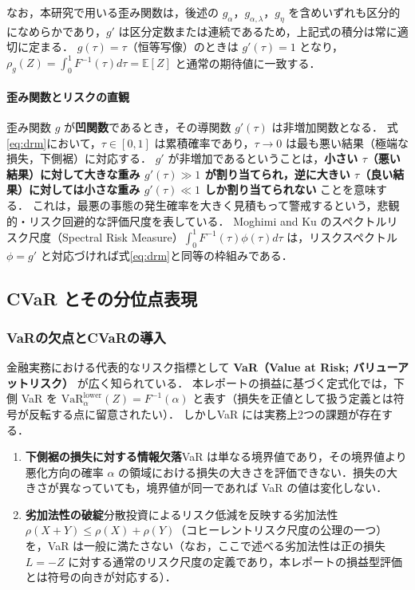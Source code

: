 \documentclass[a4paper,10pt]{jsarticle}
\theoremstyle{definition}
\renewcommand{\Finv}{F^{-1}}
\newcommand{\E}{\mathbb{E}}
\begin{document}
なお，本研究で用いる歪み関数は，後述の $g_\alpha$，$g_{\alpha,\lambda}$，$g_\eta$ を含めいずれも区分的になめらかであり，$g'$ は区分定数または連続であるため，上記式の積分は常に適切に定まる．
$g(\tau)=\tau$（恒等写像）のときは $g'(\tau)=1$ となり，$\rho_g(Z) = \int_0^1 \Finv(\tau)d\tau = \E[Z]$ と通常の期待値に一致する．

\paragraph{歪み関数とリスクの直観}
歪み関数 $g$ が\textbf{凹関数}であるとき，その導関数 $g'(\tau)$ は非増加関数となる．
式\eqref{eq:drm}において，$\tau \in [0, 1]$ は累積確率であり，$\tau \to 0$ は最も悪い結果（極端な損失，下側裾）に対応する．
$g'$ が非増加であるということは，\textbf{小さい $\tau$（悪い結果）に対して大きな重み $g'(\tau) \gg 1$ が割り当てられ，逆に大きい $\tau$（良い結果）に対しては小さな重み $g'(\tau) \ll 1$ しか割り当てられない} ことを意味する．
これは，最悪の事態の発生確率を大きく見積もって警戒するという，悲観的・リスク回避的な評価尺度を表している．
Moghimi and Ku \cite{moghimi2025beyond} のスペクトルリスク尺度（Spectral Risk Measure）$\int_0^1 \Finv(\tau)\phi(\tau)d\tau$ は，リスクスペクトル $\phi=g'$ と対応づければ式\eqref{eq:drm}と同等の枠組みである．

\subsection{CVaR とその分位点表現}
\label{subsec:cvar}

\subsubsection{VaRの欠点とCVaRの導入}
金融実務における代表的なリスク指標として \textbf{VaR（Value at Risk; バリューアットリスク）} が広く知られている．
本レポートの損益に基づく定式化では，下側 VaR を $\mathrm{VaR}^{\mathrm{lower}}_\alpha(Z) = \Finv(\alpha)$ と表す（損失を正値として扱う定義とは符号が反転する点に留意されたい）．
しかしVaR には実務上2つの課題が存在する．
\begin{enumerate}
  \item \textbf{下側裾の損失に対する情報欠落}\quad VaR は単なる境界値であり，その境界値より悪化方向の確率 $\alpha$ の領域における損失の大きさを評価できない．損失の大きさが異なっていても，境界値が同一であれば VaR の値は変化しない．
  \item \textbf{劣加法性の破綻}\quad 分散投資によるリスク低減を反映する劣加法性 $\rho(X+Y) \le \rho(X)+\rho(Y)$（コヒーレントリスク尺度の公理の一つ）を，VaR は一般に満たさない（なお，ここで述べる劣加法性は正の損失 $L=-Z$ に対する通常のリスク尺度の定義であり，本レポートの損益型評価とは符号の向きが対応する）．
\end{enumerate}
\end{document}
